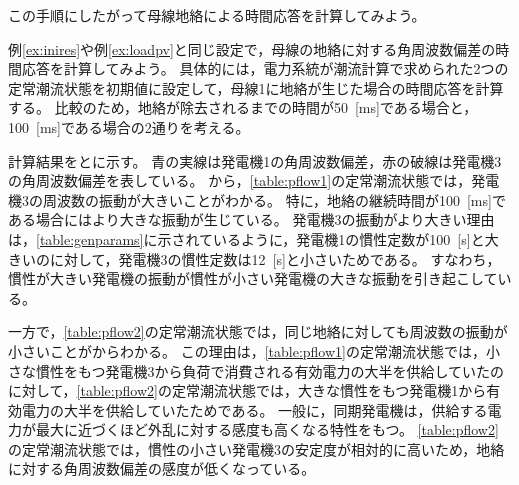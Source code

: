 \documentclass[tombow,dvipdfmx]{corona-a5-1.1}
\begin{document}
この手順にしたがって母線地絡による時間応答を計算してみよう。

\begin{例}[母線地絡に対する電力系統モデルの時間応答]\label{ex:busflt}
例\ref{ex:inires}や例\ref{ex:loadpv}と同じ設定で，母線の地絡に対する角周波数偏差の時間応答を計算してみよう。
具体的には，電力系統が潮流計算で求められた2つの定常潮流状態を初期値に設定して，母線1に地絡が生じた場合の時間応答を計算する。
比較のため，地絡が除去されるまでの時間が50~[ms]である場合と，100~[ms]である場合の2通りを考える。

計算結果をとに示す。
青の実線は発電機1の角周波数偏差，赤の破線は発電機3の角周波数偏差を表している。
から，\ref{table:pflow1}の定常潮流状態では，発電機3の周波数の振動が大きいことがわかる。
特に，地絡の継続時間が100~[ms]である場合にはより大きな振動が生じている。
発電機3の振動がより大きい理由は，\ref{table:genparams}に示されているように，発電機1の慣性定数が100~[s]と大きいのに対して，発電機3の慣性定数は12~[s]と小さいためである。
すなわち，慣性が大きい発電機の振動が慣性が小さい発電機の大きな振動を引き起こしている。

一方で，\ref{table:pflow2}の定常潮流状態では，同じ地絡に対しても周波数の振動が小さいことがからわかる。
この理由は，\ref{table:pflow1}の定常潮流状態では，小さな慣性をもつ発電機3から負荷で消費される有効電力の大半を供給していたのに対して，\ref{table:pflow2}の定常潮流状態では，大きな慣性をもつ発電機1から有効電力の大半を供給していたためである。
一般に，同期発電機は，供給する電力が最大に近づくほど外乱に対する感度も高くなる特性をもつ。
\ref{table:pflow2}の定常潮流状態では，慣性の小さい発電機3の安定度が相対的に高いため，地絡に対する角周波数偏差の感度が低くなっている。
\end{例}
\end{document}
